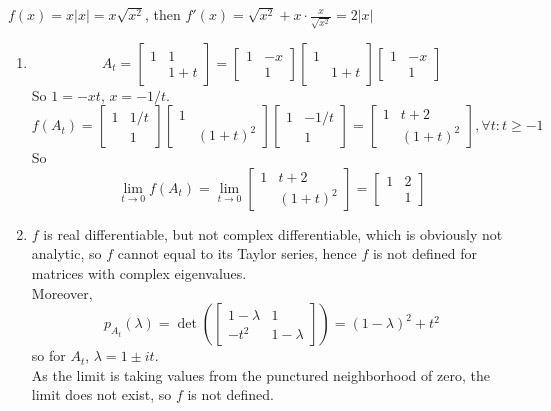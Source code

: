 \documentclass{article}
\begin{document}
$f(x)=x|x|=x\sqrt{x^2}$, then $f'(x)=\sqrt{x^2}+x\cdot \frac{x}{\sqrt{x^2}}=2|x|$
\begin{enumerate}
    \item 
    \[A_t=
    \left[\begin{array}{cc}
    1 & 1 \\
         & 1+t
    \end{array}\right] =
    \left[\begin{array}{cc}
    1 & -x \\
         & 1
    \end{array}\right]
    \left[\begin{array}{cc}
    1 &  \\
         & 1+t
    \end{array}\right]
    \left[\begin{array}{cc}
    1 & -x \\
         & 1
    \end{array}\right]
    \]
    So $1 = -xt$, $x=-1/t$.
    \[f(A_t)=
    \left[\begin{array}{cc}
    1 & 1/t \\
         & 1
    \end{array}\right]
    \left[\begin{array}{cc}
    1 &  \\
         & (1+t)^2
    \end{array}\right]
    \left[\begin{array}{cc}
    1 & -1/t \\
         & 1
    \end{array}\right]
    =
    \left[\begin{array}{cc}
    1 & t+2 \\
         & (1+t)^2
    \end{array}\right], \forall t: t\geq -1
    \]
    So
    \[\lim_{t\to 0} f(A_t) = \lim_{t\to 0}\left[\begin{array}{cc}
    1 & t+2 \\
         & (1+t)^2
    \end{array}\right]=\left[\begin{array}{cc}
    1 & 2 \\
         & 1
    \end{array}\right] \]
    \item $f$ is real differentiable, but not complex differentiable, which is obviously not analytic, so $f$ cannot equal to its Taylor series, hence $f$ is not defined for matrices with complex eigenvalues.\\
    Moreover, 
    \[p_{A_t}(\lambda) = \det\left(\left[\begin{array}{cc}
    1-\lambda & 1 \\
    -t^2 & 1-\lambda
    \end{array}\right]\right)=(1-\lambda)^2+t^2\]
    so for $A_t$, $\lambda = 1 \pm it$.\\
    As the limit is taking values from the punctured neighborhood of zero, the limit does not exist, so $f$ is not defined.
\end{enumerate}
\end{document}
